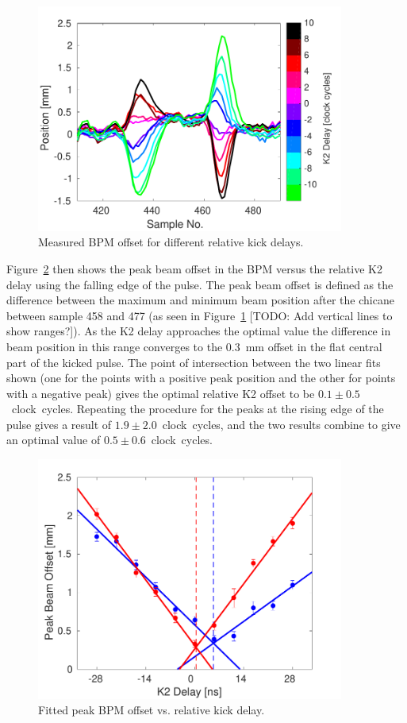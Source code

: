\begin{figure}
  \centering
  \includegraphics[width=0.9\textwidth]{Figures/commissioning/relDelay_traces}
  \caption{Measured BPM offset for different relative kick delays.}
  \label{f:relDelay_traces}
\end{figure}

Figure~\ref{f:relDelay_fit} then shows the peak beam offset in the BPM versus the relative K2 delay using the falling edge of the pulse. The peak beam offset is defined as the difference between the maximum and minimum beam position after the chicane between sample 458 and 477 (as seen in Figure~\ref{f:relDelay_traces} [TODO: Add vertical lines to show ranges?]). As the K2 delay approaches the optimal value the difference in beam position in this range converges to the 0.3~mm offset in the flat central part of the kicked pulse. The point of intersection between the two linear fits shown (one for the points with a positive peak position and the other for points with a negative peak) gives the optimal relative K2 offset to be \(0.1\pm0.5\)~clock~cycles. Repeating the procedure for the peaks at the rising edge of the pulse gives a result of \(1.9\pm2.0\)~clock~cycles, and the two results combine to give an optimal value of \(0.5\pm0.6\)~clock~cycles.

\begin{figure}
  \centering
  \includegraphics[width=0.9\textwidth]{Figures/commissioning/relDelay_fit}
  \caption{Fitted peak BPM offset vs. relative kick delay.}
  \label{f:relDelay_fit}
\end{figure}

